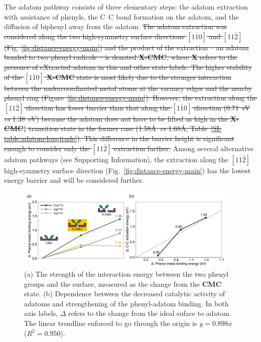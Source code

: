 \documentclass[aps,prb,amsmath,amssymb,11pt]{revtex4-1}
\newcommand{\sinfo}{Supporting Information}
\newcommand{\zhzh}{\color{blue}}
\begin{document}
The adatom pathway consists of three elementary steps: the adatom extraction with {\zhzh assistance of phenyls}, the C--C bond formation on the adatom, and the diffusion of biphenyl away from the adatom. 
\sout{The adatom extraction was considered along the two high-symmetry surface directions $[1\bar{1}0]$ and $[11\bar{2}]$ (Fig. \ref{fig:distance-energy-main}) and the product of the extraction -- an adatom bonded to two phenyl radicals -- is denoted \textbf{X-CMC}, where \textbf{X} refers to the presence of eXtracted adatom in this and other state labels. 
The higher stability of the $[1\bar{1}0]$ \textbf{X-CMC} state is most likely due to the stronger interaction between the undercoordinated metal atoms at the vacancy edges and the nearby phenyl ring (Figure~\ref{fig:distance-energy-main}).
However, the extraction along the $[11\bar{2}]$ direction has lower barrier than that along the $[1\bar{1}0]$ direction (0.71~eV \emph{vs} 1.38~eV) because the adatom does not have to be lifted as high in the \textbf{X-CMC$\ddagger$} transition state in the former case (1.58\AA\ \emph{vs} 1.68\AA, Table~\ref{SI-table:adatom-longitude}). This difference in the barrier height is significant enough to consider only the $[11\bar{2}]$ extraction further.}
%
{\zhzh Among several alternative adatom pathways (see \sinfo), the extraction along the $[11\bar{2}]$ high-symmetry surface direction (Fig.~\ref{fig:distance-energy-main}) has the lowest energy barrier and will be considered further.}

\begin{figure}[bt]
\centering
\includegraphics[width=0.95\textwidth]{Fig/onlysurface.pdf}
\caption{
(a) The strength of the interaction energy between the two phenyl groups and the surface, measured as the change from the \textbf{CMC} state. (b) Dependence between the decreased catalytic activity of adatoms and strengthening of the phenyl-adatom binding. In both axis labels, $\Delta$ refers to the change from the ideal suface to adatom. The linear trendline enforced to go through the origin is $y=0.898 x$ ($R^2 = 0.950$).}
\label{fig:onlysurface}
\end{figure}
\end{document}
